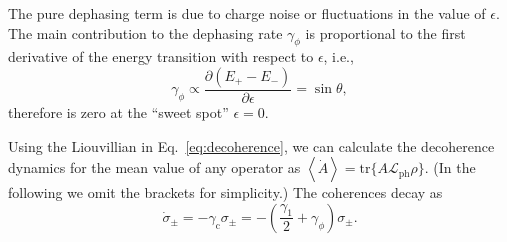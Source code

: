 \documentclass[twocolumn,english,aps,prl,preprint,reprint,showpacs,longbibliography,showkeys]{revtex4-1}
\begin{document}
The pure dephasing term is due to charge noise or fluctuations in the value of $\epsilon$. The main contribution to the dephasing rate $\gamma_{\phi}$ is proportional to the first derivative of the energy transition with respect to $\epsilon$, i.e.,
\begin{equation}
\gamma_{\phi}\propto \frac{\partial (E_+-E_-)}{\partial \epsilon}=\sin{\theta},
\end{equation}
therefore is zero at the ``sweet spot'' $\epsilon=0$.

Using the  Liouvillian in Eq.~\eqref{eq:decoherence}, we can calculate the decoherence dynamics for the mean value of any operator as $\left\langle\dot{A}\right\rangle=\mathrm{tr}\{A\mathcal{L}_{\mathrm{ph}}\rho\}$. (In the following we omit the brackets for simplicity.) The coherences decay as 
\begin{equation}
\dot{\sigma}_{\pm}=- \gamma_{\mathrm{c}}\sigma_{\pm}=-\left( \frac{\gamma_1}{2} + \gamma_{\phi}\right)\sigma_{\pm}.\label{eq:tau}
\end{equation}
\end{document}

